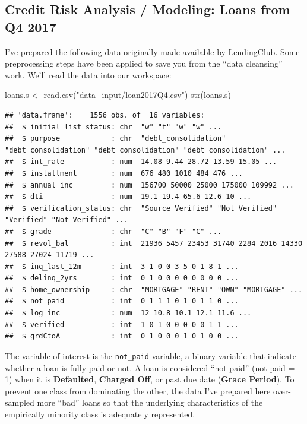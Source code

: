 \documentclass[
]{article}
\newenvironment{Shaded}{\begin{snugshade}}{\end{snugshade}}
\newcommand{\FunctionTok}[1]{\textcolor[rgb]{0.00,0.00,0.00}{#1}}
\newcommand{\NormalTok}[1]{#1}
\newcommand{\OtherTok}[1]{\textcolor[rgb]{0.56,0.35,0.01}{#1}}
\newcommand{\StringTok}[1]{\textcolor[rgb]{0.31,0.60,0.02}{#1}}
\begin{document}
\hypertarget{credit-risk-analysis-modeling-loans-from-q4-2017}{%
\subsection{Credit Risk Analysis / Modeling: Loans from Q4
2017}\label{credit-risk-analysis-modeling-loans-from-q4-2017}}

I've prepared the following data originally made available by
\href{https://www.lendingclub}{LendingClub}. Some preprocessing steps
have been applied to save you from the ``data cleansing'' work. We'll
read the data into our workspace:

\begin{Shaded}
\begin{Highlighting}[]
\NormalTok{loans.s }\OtherTok{\textless{}{-}} \FunctionTok{read.csv}\NormalTok{(}\StringTok{"data\_input/loan2017Q4.csv"}\NormalTok{)}
\FunctionTok{str}\NormalTok{(loans.s)}
\end{Highlighting}
\end{Shaded}

\begin{verbatim}
## 'data.frame':    1556 obs. of  16 variables:
##  $ initial_list_status: chr  "w" "f" "w" "w" ...
##  $ purpose            : chr  "debt_consolidation" "debt_consolidation" "debt_consolidation" "debt_consolidation" ...
##  $ int_rate           : num  14.08 9.44 28.72 13.59 15.05 ...
##  $ installment        : num  676 480 1010 484 476 ...
##  $ annual_inc         : num  156700 50000 25000 175000 109992 ...
##  $ dti                : num  19.1 19.4 65.6 12.6 10 ...
##  $ verification_status: chr  "Source Verified" "Not Verified" "Verified" "Not Verified" ...
##  $ grade              : chr  "C" "B" "F" "C" ...
##  $ revol_bal          : int  21936 5457 23453 31740 2284 2016 14330 27588 27024 11719 ...
##  $ inq_last_12m       : int  3 1 0 0 3 5 0 1 8 1 ...
##  $ delinq_2yrs        : int  0 1 0 0 0 0 0 0 0 0 ...
##  $ home_ownership     : chr  "MORTGAGE" "RENT" "OWN" "MORTGAGE" ...
##  $ not_paid           : int  0 1 1 1 0 1 0 1 1 0 ...
##  $ log_inc            : num  12 10.8 10.1 12.1 11.6 ...
##  $ verified           : int  1 0 1 0 0 0 0 0 1 1 ...
##  $ grdCtoA            : int  0 1 0 0 0 1 0 1 0 0 ...
\end{verbatim}

The variable of interest is the \texttt{not\_paid} variable, a binary
variable that indicate whether a loan is fully paid or not. A loan is
considered ``not paid'' (not paid = 1) when it is \textbf{Defaulted},
\textbf{Charged Off}, or past due date (\textbf{Grace Period}). To
prevent one class from dominating the other, the data I've prepared here
over-sampled more ``bad'' loans so that the underlying characteristics
of the empirically minority class is adequately represented.
\end{document}
